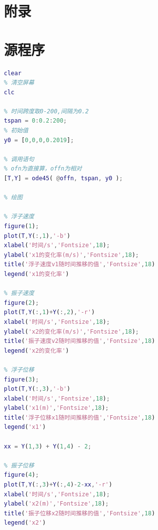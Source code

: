 \documentclass[12pt,utf8]{article}
\begin{document}
\clearpage

\section*{附录}

\appendix



\section{源程序}
 
\begin{lstlisting}[language=matlab,caption={求解问题1-1的MatLab代码}]
% 清空所有变量
clear
% 清空屏幕
clc

% 时间跨度取0-200,间隔为0.2
tspan = 0:0.2:200;
% 初始值
y0 = [0,0,0,0.2019];

% 调用语句
% ofn为直接算，offn为相对
[T,Y] = ode45( @offn, tspan, y0 );

% 绘图

% 浮子速度
figure(1);
plot(T,Y(:,1),'-b')
xlabel('时间/s','Fontsize',18);
ylabel('x1的变化率(m/s)','Fontsize',18);
title('浮子速度v1随时间推移的值','Fontsize',18)
legend('x1的变化率')

% 振子速度
figure(2);
plot(T,Y(:,1)+Y(:,2),'-r')
xlabel('时间/s','Fontsize',18);
ylabel('x2的变化率(m/s)','Fontsize',18);
title('振子速度v2随时间推移的值','Fontsize',18)
legend('x2的变化率')

% 浮子位移
figure(3);
plot(T,Y(:,3),'-b')
xlabel('时间/s','Fontsize',18);
ylabel('x1(m)','Fontsize',18);
title('浮子位移x1随时间推移的值','Fontsize',18)
legend('x1')

xx = Y(1,3) + Y(1,4) - 2;

% 振子位移
figure(4);
plot(T,Y(:,3)+Y(:,4)-2-xx,'-r')
xlabel('时间/s','Fontsize',18);
ylabel('x2(m)','Fontsize',18);
title('振子位移x2随时间推移的值','Fontsize',18)
legend('x2')
 \end{lstlisting}
\end{document}
